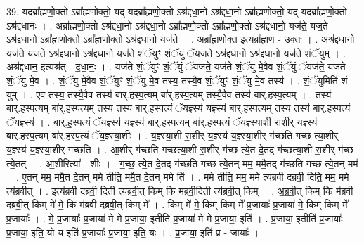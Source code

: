 \documentclass[17pt]{extarticle}
\begin{document}
39. यदब्रा᳚ह्मणो॒क्तो ऽब्रा᳚ह्मणोक्तो॒ यद् यदब्रा᳚ह्मणो॒क्तो ऽश्र॑द्दधा॒नो ऽश्र॑द्दधा॒नो ऽब्रा᳚ह्मणोक्तो॒ यद् यदब्रा᳚ह्मणो॒क्तो ऽश्र॑द्दधानः । . अब्रा᳚ह्मणो॒क्तो ऽश्र॑द्दधा॒नो ऽश्र॑द्दधा॒नो ऽब्रा᳚ह्मणो॒क्तो ऽब्रा᳚ह्मणो॒क्तो ऽश्र॑द्दधानो॒ यज॑ते॒ यज॒ते ऽश्र॑द्दधा॒नो ऽब्रा᳚ह्मणो॒क्तो ऽब्रा᳚ह्मणो॒क्तो ऽश्र॑द्दधानो॒ यज॑ते । . अब्रा᳚ह्मणोक्त॒ इत्यब्रा᳚ह्मण - उ॒क्तः॒ । . अश्र॑द्दधानो॒ यज॑ते॒ यज॒ते ऽश्र॑द्दधा॒नो ऽश्र॑द्दधानो॒ यज॑ते शं॒ॅयुꣳ शं॒ॅयुं ॅयज॒ते ऽश्र॑द्दधा॒नो ऽश्र॑द्दधानो॒ यज॑ते शं॒ॅयुम् । . अश्र॑द्दधान॒ इत्यश्र॑त् - द॒धा॒नः॒ । . यज॑ते शं॒ॅयुꣳ शं॒ॅयुं ॅयज॑ते॒ यज॑ते शं॒ॅयु मे॒वैव शं॒ॅयुं ॅयज॑ते॒ यज॑ते शं॒ॅयु मे॒व । . शं॒ॅयु मे॒वैव शं॒ॅयुꣳ शं॒ॅयु मे॒व तस्य॒ तस्यै॒व शं॒ॅयुꣳ शं॒ॅयु मे॒व तस्य॑ । . शं॒ॅयुमिति॑ शं - युम् । . ए॒व तस्य॒ तस्यै॒वैव तस्य॑ बार्.हस्प॒त्यम् बा॑र्.हस्प॒त्यम् तस्यै॒वैव तस्य॑ बार्.हस्प॒त्यम् । . तस्य॑ बार्.हस्प॒त्यम् बा॑र्.हस्प॒त्यम् तस्य॒ तस्य॑ बार्.हस्प॒त्यं ॅय॒ज्ञ्स्य॑ य॒ज्ञ्स्य॑ बार्.हस्प॒त्यम् तस्य॒ तस्य॑ बार्.हस्प॒त्यं ॅय॒ज्ञ्स्य॑ । . बा॒र्॒.ह॒स्प॒त्यं ॅय॒ज्ञ्स्य॑ य॒ज्ञ्स्य॑ बार्.हस्प॒त्यम् बा॑र्.हस्प॒त्यं ॅय॒ज्ञ्स्या॒शी रा॒शीर् य॒ज्ञ्स्य॑ बार्.हस्प॒त्यम् बा॑र्.हस्प॒त्यं ॅय॒ज्ञ्स्या॒शीः । . य॒ज्ञ्स्या॒शी रा॒शीर् य॒ज्ञ्स्य॑ य॒ज्ञ्स्या॒शीर् ग॑च्छति गच्छ त्या॒शीर् य॒ज्ञ्स्य॑ य॒ज्ञ्स्या॒शीर् ग॑च्छति । . आ॒शीर् ग॑च्छति गच्छत्या॒शी रा॒शीर् ग॑च्छ त्ये॒त दे॒तद् ग॑च्छत्या॒शी रा॒शीर् ग॑च्छ त्ये॒तत् । . आ॒शीरित्या᳚ - शीः । . ग॒च्छ॒ त्ये॒त दे॒तद् ग॑च्छति गच्छ त्ये॒तन् मम॒ ममै॒तद् ग॑च्छति गच्छ त्ये॒तन् मम॑ । . ए॒तन् मम॒ ममै॒त दे॒तन् ममे तीति॒ ममै॒त दे॒तन् ममे ति॑ । . ममे तीति॒ मम॒ ममे त्य॑ब्रवी दब्रवी॒ दिति॒ मम॒ ममे त्य॑ब्रवीत् । . इत्य॑ब्रवी दब्रवी॒ दिती त्य॑ब्रवी॒त् किम् कि म॑ब्रवी॒दिती त्य॑ब्रवी॒त् किम् । . अ॒ब्र॒वी॒त् किम् कि म॑ब्रवी दब्रवी॒त् किम् मे॑ मे॒ कि म॑ब्रवी दब्रवी॒त् किम् मे᳚ । . किम् मे॑ मे॒ किम् किम् मे᳚ प्र॒जायाः᳚ प्र॒जाया॑ मे॒ किम् किम् मे᳚ प्र॒जायाः᳚ । . मे॒ प्र॒जायाः᳚ प्र॒जाया॑ मे मे प्र॒जाया॒ इतीति॑ प्र॒जाया॑ मे मे प्र॒जाया॒ इति॑ । . प्र॒जाया॒ इतीति॑ प्र॒जायाः᳚ प्र॒जाया॒ इति॒ यो य इति॑ प्र॒जायाः᳚ प्र॒जाया॒ इति॒ यः । . प्र॒जाया॒ इति॑ प्र - जायाः᳚ । \newline
\pagebreak
{}
\end{document}

